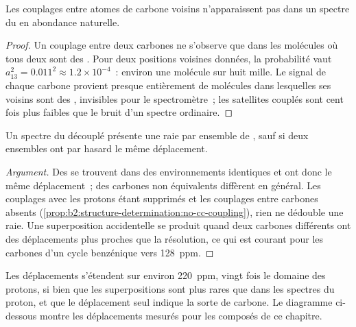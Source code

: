 \begin{proposition}\label{prop:b2:structure-determination:no-cc-coupling}
Les couplages entre atomes de carbone voisins n'apparaissent pas dans un spectre du  en
abondance naturelle.
\end{proposition}

\begin{proof}
Un couplage entre deux carbones ne s'observe que dans les molécules où tous deux sont des .
Pour deux positions voisines données, la probabilité vaut $a_{13}^2 = 0.011^2 \approx 1.2 \times 10^{-4}$~:
environ une molécule sur huit mille. Le signal de chaque carbone provient presque entièrement de molécules
dans lesquelles ses voisins sont des , invisibles pour le spectromètre~; les satellites couplés
sont cent fois plus faibles que le bruit d'un spectre ordinaire.
\end{proof}

\begin{proposition}\label{prop:b2:structure-determination:signals}
Un spectre du  découplé présente une raie par ensemble de , sauf si deux
ensembles ont par hasard le même déplacement.
\end{proposition}

\begin{proof}[Argument]
Des  se trouvent dans des environnements identiques et ont donc le même
déplacement~; des carbones non équivalents diffèrent en général. Les couplages avec les protons étant
supprimés et les couplages entre carbones absents
(\cref{prop:b2:structure-determination:no-cc-coupling}), rien ne dédouble une raie. Une superposition
accidentelle se produit quand deux carbones différents ont des déplacements plus proches que la
résolution, ce qui est courant pour les carbones d'un cycle benzénique vers \qty{128}{ppm}.
\end{proof}

Les déplacements s'étendent sur environ \qty{220}{ppm}, vingt fois le domaine des protons, si bien que
les superpositions sont plus rares que dans les spectres du proton, et que le déplacement seul indique
la sorte de carbone. Le diagramme ci-dessous montre les déplacements mesurés pour les composés de ce chapitre.

